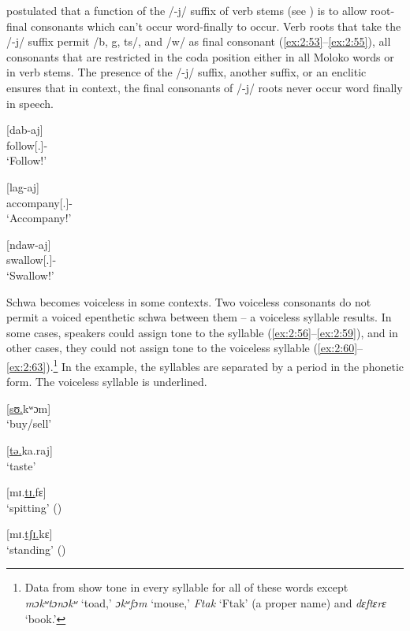 \citet{FriesenMamalis2008} postulated that a function of the /-j/ suffix of verb stems (see ) is to allow root-final consonants which can’t occur word-finally to occur. Verb roots that take the /-j/ suffix permit /b, g, ts/, and /w/ as final consonant (\ref{ex:2:53}--\ref{ex:2:55}), all consonants that are restricted in the coda position either in all Moloko words or in verb stems. The presence of the /-j/ suffix, another suffix, or an enclitic ensures that in context, the final consonants of /-j/ roots never occur word finally in speech.  

\ea \label{ex:2:53}
\textup{[dab-aj]}\\
      follow[{\twoS}.{\IMP}]{}-{\CL}\\
\glt  ‘Follow!’
\z

\ea \label{ex:2:54}
\textup{[lag-aj]}\\
      accompany[{\twoS}.{\IMP}]{}-{\CL}\\
\glt  ‘Accompany!’
\z

\clearpage
\ea \label{ex:2:55}
\textup{[ndaw-aj]}\\
      swallow[{\twoS}.{\IMP}]{}-{\CL}\\
\glt  ‘Swallow!’
\z

Schwa becomes voiceless in some contexts. Two voiceless consonants do not permit a voiced epenthetic schwa between them -- a voiceless syllable results. In some cases, speakers could assign tone to the syllable (\ref{ex:2:56}--\ref{ex:2:59}), and in other cases, they could not assign tone to the voiceless syllable (\ref{ex:2:60}--\ref{ex:2:63}).\footnote{Data from \citealt{Bow1997c} show tone in every syllable for all of these words except \textit{mɔkʷtɔnɔkʷ} ‘toad,’ \textit{ɔkʷfɔm} ‘mouse,’ \textit{Ftak} ‘Ftak’ (a proper name) and \textit{dɛftɛrɛ} ‘book.’} In the example, the syllables are separated by a period in the phonetic form. The voiceless syllable is underlined. 

\ea \label{ex:2:56}
\textup{[}\underline{\textup{sʊ.}}\textup{kʷɔm}\textup{]}\\
\glt  ‘buy/sell’
\z

\ea \label{ex:2:57}
\textup{[}\underline{\textup{tə.}}\textup{ka.raj}\textup{]}\\
\glt  ‘taste’
\z

\ea \label{ex:2:58}
\textup{[mɪ.}\underline{\textup{tɪ.}}\textup{fɛ}\textup{]}\\
\glt  ‘spitting’ ({\NOM})
\z

\ea \label{ex:2:59}
\textup{[mɪ.}\underline{\textup{tʃɪ.}}\textup{kɛ}\textup{]}\\
\glt  ‘standing’ ({\NOM})
\z

